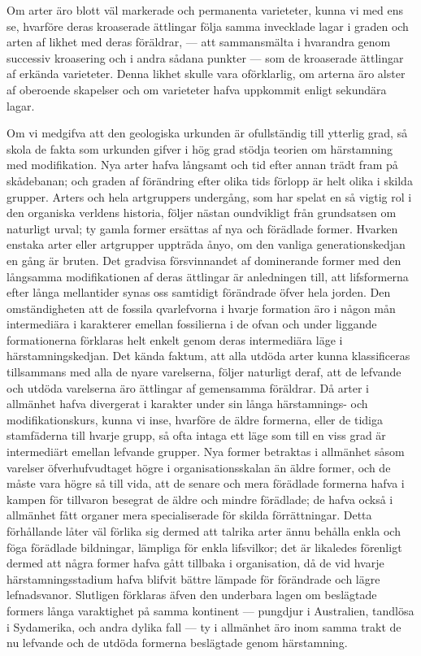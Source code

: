 Om arter äro blott väl markerade och permanenta varieteter, kunna vi med ens se, hvarföre deras kroaserade ättlingar följa samma invecklade lagar i graden och arten af likhet med deras föräldrar, — att sammansmälta i hvarandra genom successiv kroasering och i andra sådana punkter — som de kroaserade ättlingar af erkända varieteter. Denna likhet skulle vara oförklarlig, om arterna äro alster af oberoende skapelser och om varieteter hafva uppkommit enligt sekundära lagar.

Om vi medgifva att den geologiska urkunden är ofullständig till ytterlig grad, så skola de fakta som urkunden gifver i hög grad stödja teorien om härstamning med modifikation. Nya arter hafva långsamt och tid efter annan trädt fram på skådebanan; och graden af förändring efter olika tids förlopp är helt olika i skilda grupper. Arters och hela artgruppers undergång, som har spelat en så vigtig rol i den organiska verldens historia, följer nästan oundvikligt från grundsatsen om naturligt urval; ty gamla former ersättas af nya och förädlade former. Hvarken enstaka arter eller artgrupper uppträda ånyo, om den vanliga generationskedjan en gång är bruten. Det gradvisa försvinnandet af dominerande former med den långsamma modifikationen af deras ättlingar är anledningen till, att lifsformerna efter långa mellantider synas oss samtidigt förändrade öfver hela jorden. Den omständigheten att de fossila qvarlefvorna i hvarje formation äro i någon mån intermediära i karakterer emellan fossilierna i de ofvan och under liggande formationerna förklaras helt enkelt genom deras intermediära läge i härstamningskedjan. Det kända faktum, att alla utdöda arter kunna klassificeras tillsammans med alla de nyare varelserna, följer naturligt deraf, att de lefvande och utdöda varelserna äro ättlingar af gemensamma föräldrar. Då arter i allmänhet hafva divergerat i karakter under sin långa härstamnings- och modifikationskurs, kunna vi inse, hvarföre de äldre formerna, eller de tidiga stamfäderna till hvarje grupp, så ofta intaga ett läge som till en viss grad är intermediärt emellan lefvande grupper. Nya former betraktas i allmänhet såsom varelser öfverhufvudtaget högre i organisationsskalan än äldre former, och de måste vara högre så till vida, att de senare och mera förädlade formerna hafva i kampen för tillvaron besegrat de äldre och mindre förädlade; de hafva också i allmänhet fått organer mera specialiserade för skilda förrättningar. Detta förhållande låter väl förlika sig dermed att talrika arter ännu behålla enkla och föga förädlade bildningar, lämpliga för enkla lifsvilkor; det är likaledes förenligt dermed att några former hafva gått tillbaka i organisation, då de vid hvarje härstamningsstadium hafva blifvit bättre lämpade för förändrade och lägre lefnadsvanor. Slutligen förklaras äfven den underbara lagen om beslägtade formers långa varaktighet på samma kontinent — pungdjur i Australien, tandlösa i Sydamerika, och andra dylika fall — ty i allmänhet äro inom samma trakt de nu lefvande och de utdöda formerna beslägtade genom härstamning.

